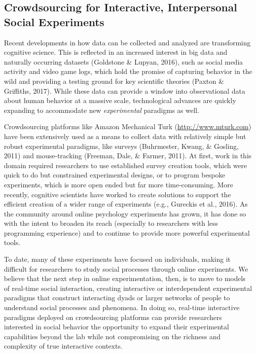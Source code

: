 \documentclass[10pt, letterpaper]{article}
\begin{document}
\subsection{Crowdsourcing for Interactive, Interpersonal Social
Experiments}\label{crowdsourcing-for-interactive-interpersonal-social-experiments}

Recent developments in how data can be collected and analyzed are
transforming cognitive science. This is reflected in an increased
interest in big data and naturally occurring datasets (Goldstone \&
Lupyan, 2016), such as social media activity and video game logs, which
hold the promise of capturing behavior in the wild and providing a
testing ground for key scientific theories (Paxton \& Griffiths, 2017).
While these data can provide a window into observational data about
human behavior at a massive scale, technological advances are quickly
expanding to accommodate new \emph{experimental} paradigms as well.

Crowdsourcing platforms like Amazon Mechanical Turk
(\url{http://www.mturk.com}) have been extensively used as a means to
collect data with relatively simple but robust experimental paradigms,
like surveys (Buhrmester, Kwang, \& Gosling, 2011) and mouse-tracking
(Freeman, Dale, \& Farmer, 2011). At first, work in this domain required
researchers to use established survey creation tools, which were quick
to do but constrained experimental designs, or to program bespoke
experiments, which is more open ended but far more time-consuming. More
recently, cognitive scientists have worked to create solutions to
support the efficient creation of a wider range of experiments (e.g.,
Gureckis et al., 2016). As the community around online psychology
experiments has grown, it has done so with the intent to broaden its
reach (especially to researchers with less programming experience) and
to continue to provide more powerful experimental tools.

To date, many of these experiments have focused on individuals, making
it difficult for researchers to study social processes through online
experiments. We believe that the next step in online experimentation,
then, is to move to models of real-time social interaction, creating
interactive or interdependent experimental paradigms that construct
interacting dyads or larger networks of people to understand social
processes and phenomena. In doing so, real-time interactive paradigms
deployed on crowdsourcing platforms can provide researchers interested
in social behavior the opportunity to expand their experimental
capabilities beyond the lab while not compromising on the richness and
complexity of true interactive contexts.
\end{document}
